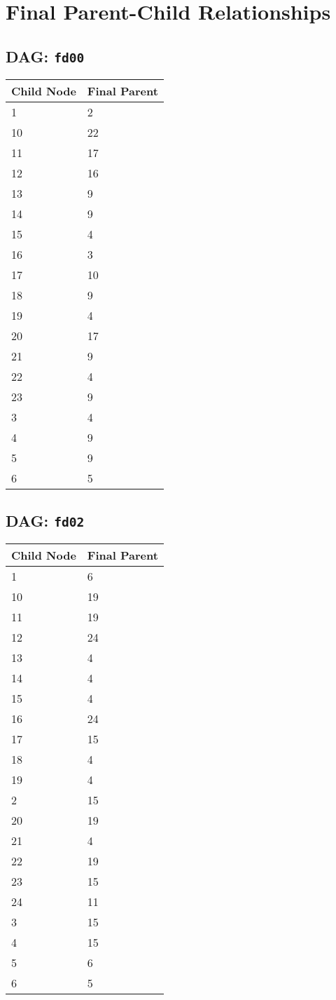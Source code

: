 \documentclass{article}
\begin{document}
\pagestyle{fancy}
\fancyhf{}
\section*{Final Parent-Child Relationships}
\subsection*{DAG: \texttt{fd00}}
\begin{tabular}{ll}
\toprule
\textbf{Child Node} & \textbf{Final Parent} \\
\midrule
1 & 2 \\
10 & 22 \\
11 & 17 \\
12 & 16 \\
13 & 9 \\
14 & 9 \\
15 & 4 \\
16 & 3 \\
17 & 10 \\
18 & 9 \\
19 & 4 \\
20 & 17 \\
21 & 9 \\
22 & 4 \\
23 & 9 \\
3 & 4 \\
4 & 9 \\
5 & 9 \\
6 & 5 \\
\bottomrule
\end{tabular}

\subsection*{DAG: \texttt{fd02}}
\begin{tabular}{ll}
\toprule
\textbf{Child Node} & \textbf{Final Parent} \\
\midrule
1 & 6 \\
10 & 19 \\
11 & 19 \\
12 & 24 \\
13 & 4 \\
14 & 4 \\
15 & 4 \\
16 & 24 \\
17 & 15 \\
18 & 4 \\
19 & 4 \\
2 & 15 \\
20 & 19 \\
21 & 4 \\
22 & 19 \\
23 & 15 \\
24 & 11 \\
3 & 15 \\
4 & 15 \\
5 & 6 \\
6 & 5 \\
\bottomrule
\end{tabular}
\end{document}
